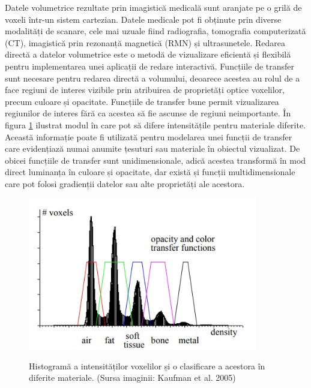 Datele volumetrice rezultate prin imagistică medicală sunt aranjate pe o grilă de voxeli într-un sistem cartezian. Datele medicale pot fi obținute prin diverse modalități de scanare, cele mai uzuale fiind radiografia, tomografia computerizată (CT), imagistică prin rezonanță magnetică (RMN) și ultrasunetele. Redarea directă a datelor volumetrice este o metodă de vizualizare eficientă și flexibilă pentru implementarea unei aplicații de redare interactivă. Funcțiile de transfer sunt necesare pentru redarea directă a volumului, deoarece acestea au rolul de a face regiuni de interes vizibile prin atribuirea de proprietăți optice voxelilor, precum culoare și opacitate. Funcțiile de transfer bune permit vizualizarea regiunilor de interes fără ca acestea să fie ascunse de regiuni neimportante. În figura \ref{fig:histogram} ilustrat modul în care pot să difere intensitățile pentru materiale diferite. Această informație poate fi utilizată pentru modelarea unei funcții de transfer care evidențiază numai anumite țesuturi sau materiale în obiectul vizualizat. De obicei funcțiile de transfer sunt unidimensionale, adică acestea transformă în mod direct luminanța în culoare și opacitate, dar există și funcții multidimensionale care pot folosi gradienții datelor sau alte proprietăți ale acestora.

\begin{figure}[!htb]
    \centering
    \includegraphics[width=10cm]{images/hist_materials.jpg}
    \\
    \caption{Histogramă a intensităților voxelilor și o clasificare a acestora în diferite materiale. (Sursa imaginii: Kaufman et al. 2005\cite{inbook})}
    \label{fig:histogram}
\end{figure}

